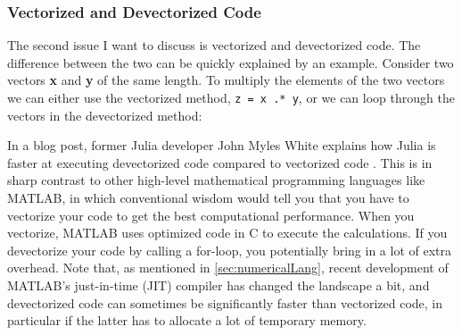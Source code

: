 \subsubsection{Vectorized and Devectorized Code}
The second issue I want to discuss is vectorized and devectorized code. The difference between the two can be quickly explained by an example. Consider two vectors \textbf{x} and \textbf{y} of the same length. To multiply the elements of the two vectors we can either use the vectorized method, \texttt{z = x .* y}, or we can loop through the vectors in the devectorized method:

In a blog post, former Julia developer John Myles White explains how Julia is faster at executing devectorized code compared to vectorized code \citep{Vectorization}. This is in sharp contrast to other high-level mathematical programming languages like MATLAB, in which conventional wisdom would tell you that you have to vectorize your code to get the best computational performance. When you vectorize, MATLAB uses optimized code in C to execute the calculations. If you devectorize your code by calling a for-loop, you potentially bring in a lot of extra overhead. Note that, as mentioned in \autoref{sec:numericalLang}, recent development of MATLAB's just-in-time (JIT) compiler has changed the landscape a bit, and devectorized code can sometimes be significantly faster than vectorized code, in particular if the latter has to allocate a lot of temporary memory. 

